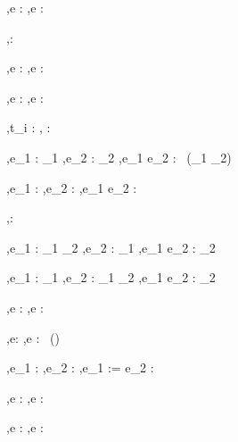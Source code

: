   {\Gamma,\Sigma \infers e : \tau}
  {\Gamma,\Sigma \infers \Done e : \Task \tau}

  {}
  {\Gamma,\Sigma \infers \Enter \beta : \Task \beta}

  {\Gamma,\Sigma \infers e : \beta}
  {\Gamma,\Sigma \infers \Update e : \Task \beta}

  {\Gamma,\Sigma \infers e : \beta}
  {\Gamma,\Sigma \infers \View e : \Task \beta}

  { \Quad
   \Gamma,\Sigma \infers t_i : \Task \tau}
  {\Gamma,\Sigma \infers \Pick {} : \Task \tau}


  {\Gamma,\Sigma \infers e_1 : \Task \tau_1 \Quad
   \Gamma,\Sigma \infers e_2 : \Task \tau_2}
  {\Gamma,\Sigma \infers e_1 \Pair e_2 : \Task\ (\tau_1 \times \tau_2)}

  {\Gamma,\Sigma \infers e_1 : \Task \tau \Quad
   \Gamma,\Sigma \infers e_2 : \Task \tau}
  {\Gamma,\Sigma \infers e_1 \Choose e_2 : \Task \tau}

  {}
  {\Gamma,\Sigma \infers \Fail : \Task \tau}


  {\Gamma,\Sigma \infers e_1 : \tau_1 \to \tau_2 \Quad
   \Gamma,\Sigma \infers e_2 : \Task \tau_1}
  {\Gamma,\Sigma \infers e_1 \Trans e_2 : \Task \tau_2}

  {\Gamma,\Sigma \infers e_1 : \Task \tau_1 \Quad
   \Gamma,\Sigma \infers e_2 : \tau_1 \to \Task \tau_2}
  {\Gamma,\Sigma \infers e_1 \Step e_2 : \Task \tau_2}

  {\Gamma,\Sigma \infers e : \Task \tau}
  {\Gamma,\Sigma \infers \Forever e : \Task \Void}


  {\Gamma,\Sigma \infers e: \beta}
  {\Gamma,\Sigma \infers \Share e : \Task\ (\Reference \beta)}

  {\Gamma,\Sigma \infers e_1 : \Reference \beta \Quad
   \Gamma,\Sigma \infers e_2 : \beta}
  {\Gamma,\Sigma \infers e_1 := e_2 : \Task \Unit}

  {\Gamma,\Sigma \infers e : \Reference \beta}
  {\Gamma,\Sigma \infers \Change e : \Task \beta}

  {\Gamma,\Sigma \infers e : \Reference \beta}
  {\Gamma,\Sigma \infers \Watch e : \Task \beta}




